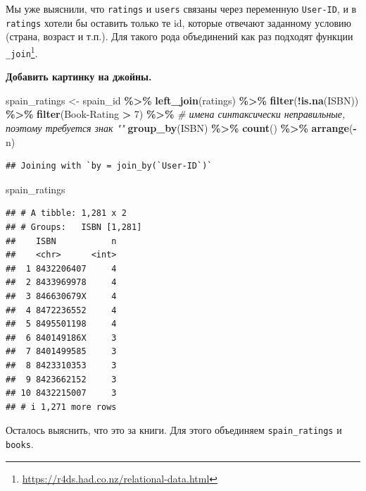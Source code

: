 \documentclass[
]{book}
\newenvironment{Shaded}{\begin{snugshade}}{\end{snugshade}}
\newcommand{\AttributeTok}[1]{\textcolor[rgb]{0.13,0.29,0.53}{#1}}
\newcommand{\CommentTok}[1]{\textcolor[rgb]{0.56,0.35,0.01}{\textit{#1}}}
\newcommand{\DecValTok}[1]{\textcolor[rgb]{0.00,0.00,0.81}{#1}}
\newcommand{\FunctionTok}[1]{\textcolor[rgb]{0.13,0.29,0.53}{\textbf{#1}}}
\newcommand{\NormalTok}[1]{#1}
\newcommand{\OtherTok}[1]{\textcolor[rgb]{0.56,0.35,0.01}{#1}}
\newcommand{\SpecialCharTok}[1]{\textcolor[rgb]{0.81,0.36,0.00}{\textbf{#1}}}
\newcommand{\StringTok}[1]{\textcolor[rgb]{0.31,0.60,0.02}{#1}}
\theoremstyle{definition}
\theoremstyle{definition}
\theoremstyle{definition}
\theoremstyle{definition}
\theoremstyle{remark}
\begin{document}
Мы уже выяснили, что \texttt{ratings} и \texttt{users} связаны через переменную \texttt{User-ID}, и в \texttt{ratings} хотели бы оставить только те id, которые отвечают заданному условию (страна, возраст и т.п.). Для такого рода объединений как раз подходят функции \texttt{\_join}\footnote{\url{https://r4ds.had.co.nz/relational-data.html}}.

\textbf{Добавить картинку на джойны.}

\begin{Shaded}
\begin{Highlighting}[]
\NormalTok{spain\_ratings }\OtherTok{\textless{}{-}}\NormalTok{ spain\_id }\SpecialCharTok{\%\textgreater{}\%} 
  \FunctionTok{left\_join}\NormalTok{(ratings) }\SpecialCharTok{\%\textgreater{}\%} 
  \FunctionTok{filter}\NormalTok{(}\SpecialCharTok{!}\FunctionTok{is.na}\NormalTok{(ISBN)) }\SpecialCharTok{\%\textgreater{}\%} 
  \FunctionTok{filter}\NormalTok{(}\StringTok{\textasciigrave{}}\AttributeTok{Book{-}Rating}\StringTok{\textasciigrave{}} \SpecialCharTok{\textgreater{}} \DecValTok{7}\NormalTok{) }\SpecialCharTok{\%\textgreater{}\%} \CommentTok{\# имена синтаксически неправильные, поэтому требуется знак "\textasciigrave{}"}
  \FunctionTok{group\_by}\NormalTok{(ISBN) }\SpecialCharTok{\%\textgreater{}\%} 
  \FunctionTok{count}\NormalTok{() }\SpecialCharTok{\%\textgreater{}\%} 
  \FunctionTok{arrange}\NormalTok{(}\SpecialCharTok{{-}}\NormalTok{n)}
\end{Highlighting}
\end{Shaded}

\begin{verbatim}
## Joining with `by = join_by(`User-ID`)`
\end{verbatim}

\begin{Shaded}
\begin{Highlighting}[]
\NormalTok{spain\_ratings}
\end{Highlighting}
\end{Shaded}

\begin{verbatim}
## # A tibble: 1,281 x 2
## # Groups:   ISBN [1,281]
##    ISBN           n
##    <chr>      <int>
##  1 8432206407     4
##  2 8433969978     4
##  3 846630679X     4
##  4 8472236552     4
##  5 8495501198     4
##  6 840149186X     3
##  7 8401499585     3
##  8 8423310353     3
##  9 8423662152     3
## 10 8432215007     3
## # i 1,271 more rows
\end{verbatim}

Осталось выяснить, что это за книги. Для этого объединяем \texttt{spain\_ratings} и \texttt{books}.
\end{document}
